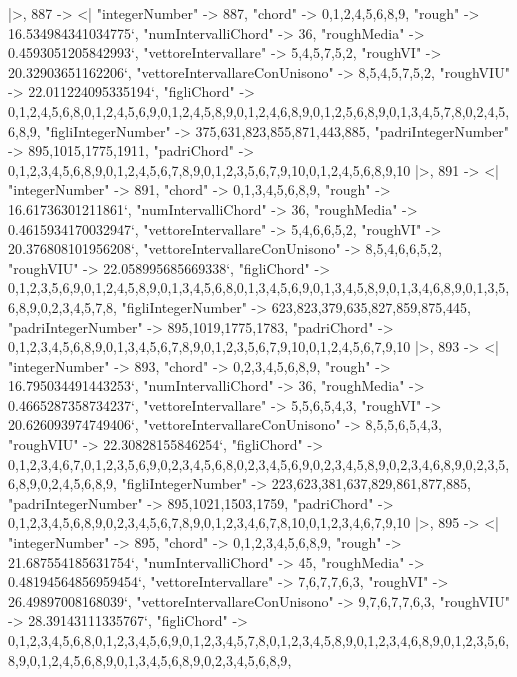 \documentclass[
]{article}
\begin{document}
\begin{DatasetVerbatim}
  |>,
  887 -> <|
    "integerNumber" -> 887,
    "chord" -> {0,1,2,4,5,6,8,9},
    "rough" -> 16.534984341034775`,
    "numIntervalliChord" -> 36,
    "roughMedia" -> 0.4593051205842993`,
    "vettoreIntervallare" -> {5,4,5,7,5,2},
    "roughVI" -> 20.32903651162206`,
    "vettoreIntervallareConUnisono" -> {8,5,4,5,7,5,2},
    "roughVIU" -> 22.011224095335194`,
    "figliChord" -> {{0,1,2,4,5,6,8},{0,1,2,4,5,6,9},{0,1,2,4,5,8,9},{0,1,2,4,6,8,9},{0,1,2,5,6,8,9},{0,1,3,4,5,7,8},{0,2,4,5,6,8,9}},
    "figliIntegerNumber" -> {375,631,823,855,871,443,885},
    "padriIntegerNumber" -> {895,1015,1775,1911},
    "padriChord" -> {{0,1,2,3,4,5,6,8,9},{0,1,2,4,5,6,7,8,9},{0,1,2,3,5,6,7,9,10},{0,1,2,4,5,6,8,9,10}}
  |>,
  891 -> <|
    "integerNumber" -> 891,
    "chord" -> {0,1,3,4,5,6,8,9},
    "rough" -> 16.61736301211861`,
    "numIntervalliChord" -> 36,
    "roughMedia" -> 0.4615934170032947`,
    "vettoreIntervallare" -> {5,4,6,6,5,2},
    "roughVI" -> 20.376808101956208`,
    "vettoreIntervallareConUnisono" -> {8,5,4,6,6,5,2},
    "roughVIU" -> 22.058995685669338`,
    "figliChord" -> {{0,1,2,3,5,6,9},{0,1,2,4,5,8,9},{0,1,3,4,5,6,8},{0,1,3,4,5,6,9},{0,1,3,4,5,8,9},{0,1,3,4,6,8,9},{0,1,3,5,6,8,9},{0,2,3,4,5,7,8}},
    "figliIntegerNumber" -> {623,823,379,635,827,859,875,445},
    "padriIntegerNumber" -> {895,1019,1775,1783},
    "padriChord" -> {{0,1,2,3,4,5,6,8,9},{0,1,3,4,5,6,7,8,9},{0,1,2,3,5,6,7,9,10},{0,1,2,4,5,6,7,9,10}}
  |>,
  893 -> <|
    "integerNumber" -> 893,
    "chord" -> {0,2,3,4,5,6,8,9},
    "rough" -> 16.795034491443253`,
    "numIntervalliChord" -> 36,
    "roughMedia" -> 0.4665287358734237`,
    "vettoreIntervallare" -> {5,5,6,5,4,3},
    "roughVI" -> 20.626093974749406`,
    "vettoreIntervallareConUnisono" -> {8,5,5,6,5,4,3},
    "roughVIU" -> 22.30828155846254`,
    "figliChord" -> {{0,1,2,3,4,6,7},{0,1,2,3,5,6,9},{0,2,3,4,5,6,8},{0,2,3,4,5,6,9},{0,2,3,4,5,8,9},{0,2,3,4,6,8,9},{0,2,3,5,6,8,9},{0,2,4,5,6,8,9}},
    "figliIntegerNumber" -> {223,623,381,637,829,861,877,885},
    "padriIntegerNumber" -> {895,1021,1503,1759},
    "padriChord" -> {{0,1,2,3,4,5,6,8,9},{0,2,3,4,5,6,7,8,9},{0,1,2,3,4,6,7,8,10},{0,1,2,3,4,6,7,9,10}}
  |>,
  895 -> <|
    "integerNumber" -> 895,
    "chord" -> {0,1,2,3,4,5,6,8,9},
    "rough" -> 21.687554185631754`,
    "numIntervalliChord" -> 45,
    "roughMedia" -> 0.48194564856959454`,
    "vettoreIntervallare" -> {7,6,7,7,6,3},
    "roughVI" -> 26.49897008168039`,
    "vettoreIntervallareConUnisono" -> {9,7,6,7,7,6,3},
    "roughVIU" -> 28.39143111335767`,
    "figliChord" -> {{0,1,2,3,4,5,6,8},{0,1,2,3,4,5,6,9},{0,1,2,3,4,5,7,8},{0,1,2,3,4,5,8,9},{0,1,2,3,4,6,8,9},{0,1,2,3,5,6,8,9},{0,1,2,4,5,6,8,9},{0,1,3,4,5,6,8,9},{0,2,3,4,5,6,8,9}},

\end{DatasetVerbatim}
\end{document}
